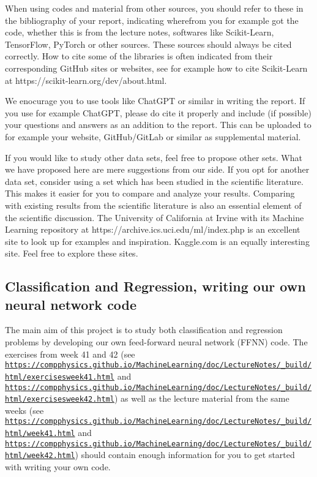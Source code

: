 \documentclass[%
oneside,                 %
final,                   %
10pt]{article}
\begin{document}
When using codes and material from other sources, you should refer to
these in the bibliography of your report, indicating wherefrom you for
example got the code, whether this is from the lecture notes,
softwares like Scikit-Learn, TensorFlow, PyTorch or other
sources. These sources should always be cited correctly. How to cite
some of the libraries is often indicated from their corresponding
GitHub sites or websites, see for example how to cite Scikit-Learn at
https://scikit-learn.org/dev/about.html.

We enocurage you to use tools like ChatGPT or similar in writing the
report. If you use for example ChatGPT, please do cite it properly and
include (if possible) your questions and answers as an addition to the
report. This can be uploaded to for example your website,
GitHub/GitLab or similar as supplemental material.

If you would like to study other data sets, feel free to propose other
sets. What we have proposed here are mere suggestions from our
side. If you opt for another data set, consider using a set which has
been studied in the scientific literature. This makes it easier for
you to compare and analyze your results. Comparing with existing
results from the scientific literature is also an essential element of
the scientific discussion. The University of California at Irvine with
its Machine Learning repository at
https://archive.ics.uci.edu/ml/index.php is an excellent site to look
up for examples and inspiration. Kaggle.com is an equally interesting
site. Feel free to explore these sites. 

\subsection*{Classification and Regression, writing our own neural network code}

The main aim of this project is to study both classification and
regression problems by developing our own 
feed-forward neural network (FFNN) code. The exercises from week 41 and 42 (see \href{{https://compphysics.github.io/MachineLearning/doc/LectureNotes/_build/html/exercisesweek41.html}}{\nolinkurl{https://compphysics.github.io/MachineLearning/doc/LectureNotes/_build/html/exercisesweek41.html}} and \href{{https://compphysics.github.io/MachineLearning/doc/LectureNotes/_build/html/exercisesweek42.html}}{\nolinkurl{https://compphysics.github.io/MachineLearning/doc/LectureNotes/_build/html/exercisesweek42.html}}) as well as the lecture material from the same weeks (see  \href{{https://compphysics.github.io/MachineLearning/doc/LectureNotes/_build/html/week41.html}}{\nolinkurl{https://compphysics.github.io/MachineLearning/doc/LectureNotes/_build/html/week41.html}} and \href{{https://compphysics.github.io/MachineLearning/doc/LectureNotes/_build/html/week42.html}}{\nolinkurl{https://compphysics.github.io/MachineLearning/doc/LectureNotes/_build/html/week42.html}}) should contain enough information for you to get started with writing your own code.
\end{document}
